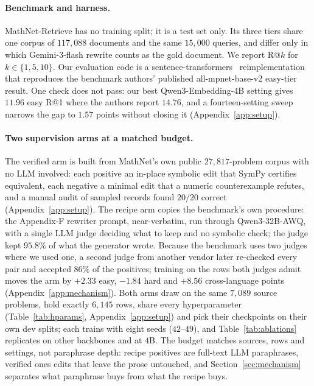\paragraph{Benchmark and harness.}
MathNet-Retrieve has no training split; it is a test set only. Its three tiers share one corpus of $117{,}088$ documents and the same $15{,}000$ queries, and differ only in which Gemini-3-flash rewrite counts as the gold document. We report R@$k$ for $k \in \{1,5,10\}$. Our evaluation code is a sentence-transformers~\citep{reimers2019sentencebert} reimplementation that reproduces the benchmark authors' published all-mpnet-base-v2 easy-tier result. One check does not pass: our best Qwen3-Embedding-4B setting gives $11.96$ easy R@1 where the authors report $14.76$, and a fourteen-setting sweep narrows the gap to $1.57$ points without closing it (Appendix~\ref{app:setup}).

\paragraph{Two supervision arms at a matched budget.}
The verified arm is built from MathNet's own public $27{,}817$-problem corpus with no LLM involved: each positive an in-place symbolic edit that SymPy certifies equivalent, each negative a minimal edit that a numeric counterexample refutes, and a manual audit of sampled records found $20/20$ correct (Appendix~\ref{app:setup}). The recipe arm copies the benchmark's own procedure: the Appendix-F rewriter prompt, near-verbatim, run through Qwen3-32B-AWQ, with a single LLM judge deciding what to keep and no symbolic check; the judge kept $95.8\%$ of what the generator wrote. Because the benchmark uses two judges where we used one, a second judge from another vendor later re-checked every pair and accepted $86\%$ of the positives; training on the rows both judges admit moves the arm by $+2.33$ easy, $-1.84$ hard and $+8.56$ cross-language points (Appendix~\ref{app:mechanism}). Both arms draw on the same $7{,}089$ source problems, hold exactly $6{,}145$ rows, share every hyperparameter (Table~\ref{tab:hparams}, Appendix~\ref{app:setup}) and pick their checkpoints on their own dev splits; each trains with eight seeds ($42$--$49$), and Table~\ref{tab:ablations} replicates on other backbones and at $4$B. The budget matches sources, rows and settings, not paraphrase depth: recipe positives are full-text LLM paraphrases, verified ones edits that leave the prose untouched, and Section~\ref{sec:mechanism} separates what paraphrase buys from what the recipe buys.

